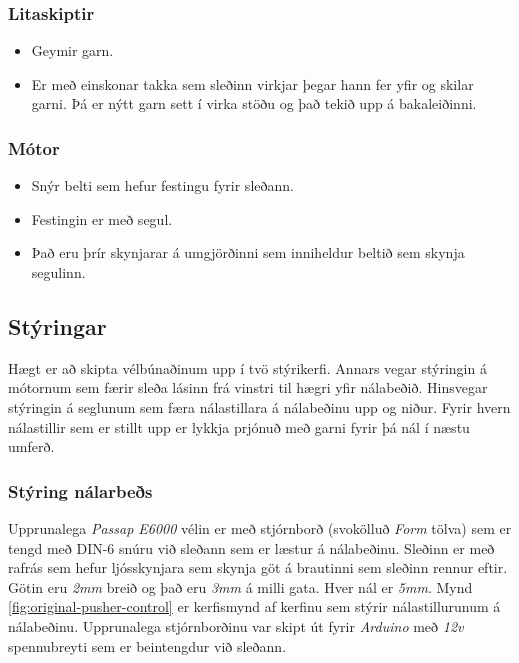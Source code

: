 \subsubsection{Litaskiptir}    
    \begin{itemize}
        \item Geymir garn.
        \item Er með einskonar takka sem sleðinn virkjar þegar hann fer yfir og skilar garni. Þá er nýtt garn sett í virka stöðu og það tekið upp á bakaleiðinni.
    \end{itemize}
\subsubsection{Mótor}    
    \begin{itemize}
        \item Snýr belti sem hefur festingu fyrir sleðann.
        \item Festingin er með segul.
        \item Það eru þrír skynjarar á umgjörðinni sem inniheldur beltið sem skynja segulinn.
    \end{itemize}
\subsection{Stýringar}
Hægt er að skipta vélbúnaðinum upp í tvö stýrikerfi. Annars vegar stýringin á mótornum sem færir sleða lásinn frá vinstri til hægri yfir nálabeðið. Hinsvegar stýringin á seglunum sem færa nálastillara á nálabeðinu upp og niður. Fyrir hvern nálastillir sem er stillt upp er lykkja prjónuð með garni fyrir þá nál í næstu umferð.
\subsubsection{Stýring nálarbeðs}
Upprunalega \textit{Passap E6000} vélin er með stjórnborð (svokölluð \textit{Form} tölva) sem er tengd með DIN-6 snúru við sleðann sem er læstur á nálabeðinu. Sleðinn er
með rafrás sem hefur ljósskynjara sem skynja göt á brautinni sem sleðinn rennur eftir. Götin eru \textit{2mm} breið og það eru \textit{3mm} á milli gata. Hver nál er \textit{5mm}. Mynd \ref{fig:original-pusher-control} er kerfismynd af kerfinu sem stýrir nálastillurunum á nálabeðinu. Upprunalega stjórnborðinu var skipt út fyrir \textit{Arduino} með \textit{12v} spennubreyti sem er beintengdur við sleðann.

